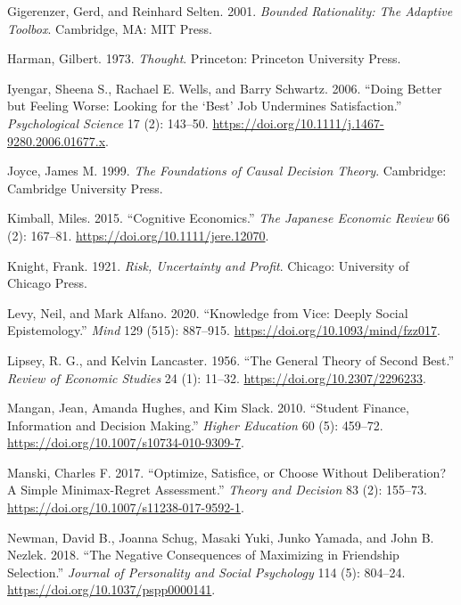 \documentclass[
  11pt,
  letterpaper,
  DIV=11,
  numbers=noendperiod,
  oneside]{scrartcl}
\newlength{\cslhangindent}
\newenvironment{CSLReferences}[2] %
 {\begin{list}{}{%
  \setlength{\itemindent}{0pt}
  \setlength{\leftmargin}{0pt}
  \setlength{\parsep}{0pt}
  \ifodd #1
   \setlength{\leftmargin}{\cslhangindent}
   \setlength{\itemindent}{-1\cslhangindent}
  \fi
  \setlength{\itemsep}{#2\baselineskip}}}
 {\end{list}}
\begin{document}
\begin{CSLReferences}{1}{0}
Gigerenzer, Gerd, and Reinhard Selten. 2001. \emph{Bounded Rationality:
The Adaptive Toolbox}. Cambridge, MA: MIT Press.

Harman, Gilbert. 1973. \emph{Thought}. Princeton: Princeton University
Press.

Iyengar, Sheena S., Rachael E. Wells, and Barry Schwartz. 2006. {``Doing
Better but Feeling Worse: Looking for the {`Best'} Job Undermines
Satisfaction.''} \emph{Psychological Science} 17 (2): 143--50.
\url{https://doi.org/10.1111/j.1467-9280.2006.01677.x}.

Joyce, James M. 1999. \emph{The Foundations of Causal Decision Theory}.
Cambridge: Cambridge University Press.

Kimball, Miles. 2015. {``Cognitive Economics.''} \emph{The Japanese
Economic Review} 66 (2): 167--81.
\url{https://doi.org/10.1111/jere.12070}.

Knight, Frank. 1921. \emph{Risk, Uncertainty and Profit}. Chicago:
University of Chicago Press.

Levy, Neil, and Mark Alfano. 2020. {``Knowledge from Vice: Deeply Social
Epistemology.''} \emph{Mind} 129 (515): 887--915.
\url{https://doi.org/10.1093/mind/fzz017}.

Lipsey, R. G., and Kelvin Lancaster. 1956. {``The General Theory of
Second Best.''} \emph{Review of Economic Studies} 24 (1): 11--32.
\url{https://doi.org/10.2307/2296233}.

Mangan, Jean, Amanda Hughes, and Kim Slack. 2010. {``Student Finance,
Information and Decision Making.''} \emph{Higher Education} 60 (5):
459--72. \url{https://doi.org/10.1007/s10734-010-9309-7}.

Manski, Charles F. 2017. {``Optimize, Satisfice, or Choose Without
Deliberation? A Simple Minimax-Regret Assessment.''} \emph{Theory and
Decision} 83 (2): 155--73.
\url{https://doi.org/10.1007/s11238-017-9592-1}.

Newman, David B., Joanna Schug, Masaki Yuki, Junko Yamada, and John B.
Nezlek. 2018. {``The Negative Consequences of Maximizing in Friendship
Selection.''} \emph{Journal of Personality and Social Psychology} 114
(5): 804--24. \url{https://doi.org/10.1037/pspp0000141}.


\end{CSLReferences}
\end{document}
